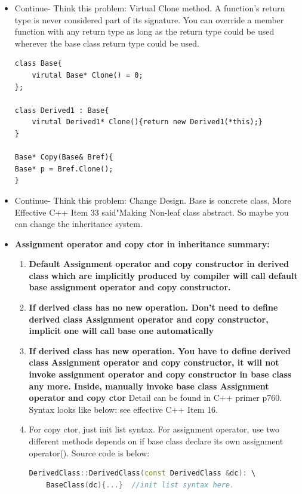\documentclass[a4paper,11pt,twoside]{book}
\begin{document}
\begin{itemize}
\item Continue- Think this problem: Virtual Clone method.
	A function's return type is never considered part of its signature. You can override a member function with any return type as long as the return type could be used wherever the base class return type could be used.
\begin{lstlisting}[numbers=none]
class Base{
	virutal Base* Clone() = 0;
};
	
class Derived1 : Base{
	virutal Derived1* Clone(){return new Derived1(*this);}
}
	
Base* Copy(Base& Bref){
Base* p = Bref.Clone();
}
\end{lstlisting}
	
	\item Continue- Think this problem: Change Design. Base is concrete class,  More Effective C++ Item 33 said"Making Non-leaf class abstract. So maybe you can change the inheritance system.
	
	\item \textbf{Assignment operator and copy ctor in inheritance summary:}
	\begin{enumerate}
		\item \textbf{Default Assignment  operator and  copy constructor in derived class which are implicitly produced by compiler will call default base assignment  operator and  copy constructor.}
		
		\item \textbf{If derived class has no new operation. Don't need to define derived class Assignment  operator and  copy constructor, implicit one will call base one automatically}
		
		\item \textbf{If derived class has new operation. You have to define derived class Assignment  operator and  copy constructor, it will not invoke assignment  operator and  copy constructor in base class any more.  Inside, manually invoke base class Assignment operator and copy ctor } Detail can be found in C++ primer p760. Syntax looks like below: see effective C++ Item 16.
		
		\item For copy ctor, just init list syntax. For assignment operator, use two different methods depends on if base class declare its own assignment operator(). Source code is below:
		
\begin{lstlisting}[frame=single, language=c++]
DerivedClass::DerivedClass(const DerivedClass &dc): \
	BaseClass(dc){...}  //init list syntax here.
		

\end{lstlisting}
\end{enumerate}
\end{itemize}
\end{document}
